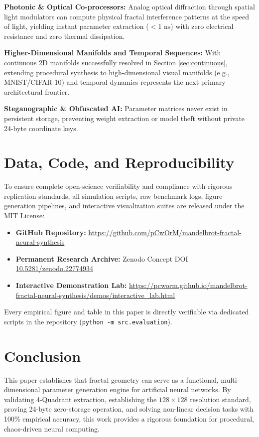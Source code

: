 \documentclass[10pt,journal,compsoc,twocolumn]{article}
\begin{document}
\textbf{Photonic \& Optical Co-processors:} Analog optical diffraction through spatial light modulators can compute physical fractal interference patterns at the speed of light, yielding instant parameter extraction ($< 1\text{ ns}$) with zero electrical resistance and zero thermal dissipation.

\textbf{Higher-Dimensional Manifolds and Temporal Sequences:} With continuous 2D manifolds successfully resolved in Section \ref{sec:continuous}, extending procedural synthesis to high-dimensional visual manifolds (e.g., MNIST/CIFAR-10) and temporal dynamics represents the next primary architectural frontier.

\textbf{Steganographic \& Obfuscated AI:} Parameter matrices never exist in persistent storage, preventing weight extraction or model theft without private 24-byte coordinate keys.

\section{Data, Code, and Reproducibility}
To ensure complete open-science verifiability and compliance with rigorous replication standards, all simulation scripts, raw benchmark logs, figure generation pipelines, and interactive visualization suites are released under the MIT License:
\begin{itemize}
    \item \textbf{GitHub Repository:} \url{https://github.com/pCwOrM/mandelbrot-fractal-neural-synthesis}
    \item \textbf{Permanent Research Archive:} Zenodo Concept DOI \href{https://doi.org/10.5281/zenodo.22774934}{10.5281/zenodo.22774934}~\cite{dagli2026mandelbrot}
    \item \textbf{Interactive Demonstration Lab:} \url{https://pcworm.github.io/mandelbrot-fractal-neural-synthesis/demos/interactive_lab.html}
\end{itemize}
Every empirical figure and table in this paper is directly verifiable via dedicated scripts in the repository (\texttt{python -m src.evaluation}).

\section{Conclusion}
This paper establishes that fractal geometry can serve as a functional, multi-dimensional parameter generation engine for artificial neural networks. By validating 4-Quadrant extraction, establishing the $128 \times 128$ resolution standard, proving 24-byte zero-storage operation, and solving non-linear decision tasks with 100\% empirical accuracy, this work provides a rigorous foundation for procedural, chaos-driven neural computing.
\end{document}
